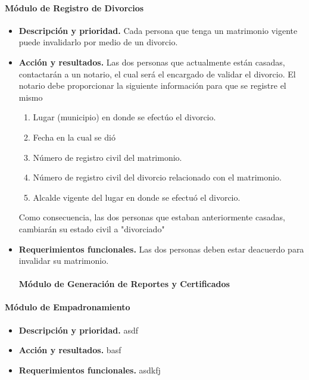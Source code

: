 \paragraph{M\'{o}dulo de Registro de Divorcios}
\begin{itemize}
\item \textbf{Descripci\'{o}n y prioridad.} Cada persona que tenga un matrimonio vigente puede invalidarlo por medio de un divorcio.
\item \textbf{Acci\'{o}n y resultados.} Las dos personas que actualmente est\'{a}n casadas, contactar\'{a}n a un notario, el cual ser\'{a} el encargado de validar el divorcio. El notario debe proporcionar la siguiente informaci\'{o}n para que se registre el mismo
\begin{enumerate}
\item Lugar (municipio) en donde se efect\'{u}o el divorcio.
\item Fecha en la cual se di\'{o}
\item N\'{u}mero de registro civil del matrimonio.
\item N\'{u}mero de registro civil del divorcio relacionado con el matrimonio.
\item Alcalde vigente del lugar en donde se efectu\'{o} el divorcio.
\end{enumerate}

Como consecuencia, las dos personas que estaban anteriormente casadas, cambiar\'{a}n su estado civil a "divorciado"

\item \textbf{Requerimientos funcionales.} Las dos personas deben estar deacuerdo para invalidar su matrimonio.

\paragraph{M\'{o}dulo de Generaci\'{o}n de Reportes y Certificados}

\end{itemize}

\paragraph{M\'{o}dulo de Empadronamiento}
\begin{itemize}
\item \textbf{Descripci\'{o}n y prioridad.} asdf
\item \textbf{Acci\'{o}n y resultados.} basf
\item \textbf{Requerimientos funcionales.} asdkfj
\end{itemize}

